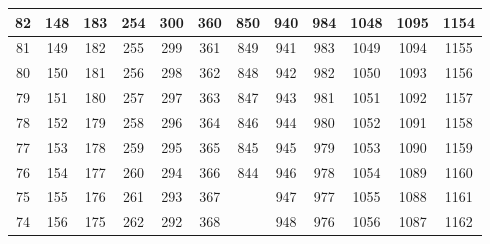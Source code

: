 \begin{center}
{\begin{tabular} {| c | c | c | c | c | c | c | c | c | c | c | c | }
 82                      & 148                      &  183 & 254 & 300                      & 360                      & 850 & 940                      &  984                      & 1048 & 1095                       & 1154                      \\ \hline
 81                      & 149                      &  182 & 255 & 299                      & 361                      & 849 & 941                      &  983                      & 1049 & 1094                       & 1155                      \\ \hline
 80                      & 150                      &  181 & 256 & 298                      & 362                      & 848 & 942                      &  982                      & 1050 & 1093                       & 1156                      \\ \hline
 79                      & 151                      &  180 & 257 & 297                      & 363                      & 847 & 943                      &  981                      & 1051 & 1092                       & 1157                      \\ \hline
 78                      & 152                      &  179 & 258 & 296                      & 364                      & 846 & 944                      &  980                      & 1052 & 1091                       & 1158                      \\ \hline
 77                      & 153                      &  178 & 259 & 295                      & 365                      & 845 & 945                      &  979                      & 1053 & 1090                       & 1159                      \\ \hline
 76                      & 154                      &  177 & 260 & 294                      & 366                      & 844 & 946                      &  978                      & 1054 & 1089                       & 1160                      \\ \hline
 75                      & 155                      &  176 & 261 & 293                      & 367                      &     & 947                      &  977                      & 1055 & 1088                       & 1161                      \\ \hline
 74                      & 156                      &  175 & 262 & 292                      & 368                      &     & 948                      &  976                      & 1056 & 1087                       & 1162                      \\ \hline

\end{tabular}}
\end{center}
